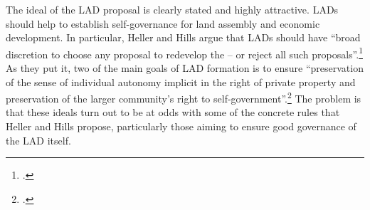  

The ideal of the LAD proposal is clearly stated and highly attractive. LADs should help to establish self-governance for land assembly and economic development. In particular, Heller and Hills argue that LADs should have ``broad discretion to choose any proposal to redevelop the  -- or reject all such proposals''.\footcite[See][1496]{heller08} As they put it, two of the main goals of LAD formation is to ensure ``preservation of the sense of individual autonomy implicit in the right of private property and preservation of the larger community's right to self-government''.\footcite[See][1498]{heller08} The problem is that these ideals turn out to be at odds with some of the concrete rules that Heller and Hills propose, particularly those aiming to ensure good governance of the LAD itself.

